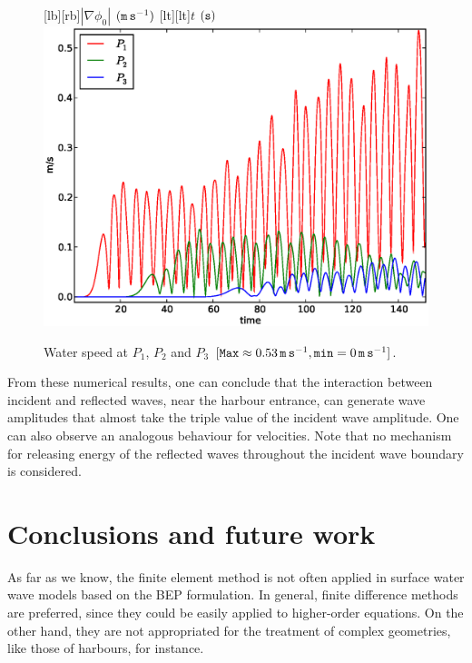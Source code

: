 \begin{figure}[!htb]
{\centering
{}[lb][rb]{$|\nabla \phi_0|$ $({\tt m\,s}^{-1})$}
[lt][lt]{$t$ $({\tt s})$}
\includegraphics[width=\largewidth]{chapters/lopes/eps/velprofile.eps}
\caption{Water speed  at $P_1$, $P_2$ and $P_3$
\([{\tt Max}\approx 0.53\, {\tt m\, s}^{-1}, {\tt min}=0\,{\tt m\, s}^{-1}]\).}\label{lopes:fig:velp}\par}
\end{figure}

From these numerical results, one can conclude that the
interaction between incident and reflected waves, near the harbour entrance,
 can generate wave amplitudes that  almost  take the
 triple value  of the incident wave amplitude.
One can also observe an analogous behaviour for
velocities.
Note that no
mechanism for releasing energy of the reflected waves
throughout the incident wave boundary is considered.
       

\section{Conclusions and future work}

As far as we know,  the finite element 
method is not often applied in surface water wave models
based on the BEP formulation. 
In general, finite difference methods are preferred, since
they could be easily applied to higher-order equations. 
On the  other hand, they are not appropriated for the
treatment of complex geometries, like those of harbours,
for instance.  

